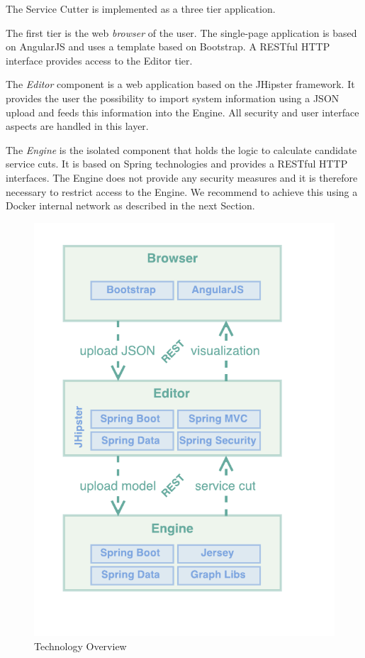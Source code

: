 \begin{minipage}[t]{0.5\textwidth}
\setlength{\parskip}{5pt plus 0.1pt}
	The Service Cutter is implemented as a three tier application.
	
	The first tier is the web \textit{browser} of the user. The single-page application is based on AngularJS\cite{angularjs} and uses a template based on Bootstrap\cite{bootstrap}. A RESTful HTTP interface provides access to the Editor tier.
	
	The \textit{Editor} component is a web application based on the JHipster\cite{jhipster} framework. It provides the user the possibility to import system information using a JSON upload and feeds this information into the Engine. All security and user interface aspects are handled in this layer.
	
	The \textit{Engine} is the isolated component that holds the logic to calculate candidate service cuts. It is based on Spring technologies and provides a RESTful HTTP interfaces. The Engine does not provide any security measures and it is therefore necessary to restrict access to the Engine. We recommend to achieve this using a Docker\cite{docker} internal network as described in the next Section.
	
\end{minipage}
\begin{minipage}[t]{0.5\textwidth}
	\begin{figure}[H]
		\includegraphics[scale=1]{diagrams/Technologies.pdf}
		\caption{Technology Overview}
		\label{fig:technologies}
	\end{figure}
\end{minipage}

